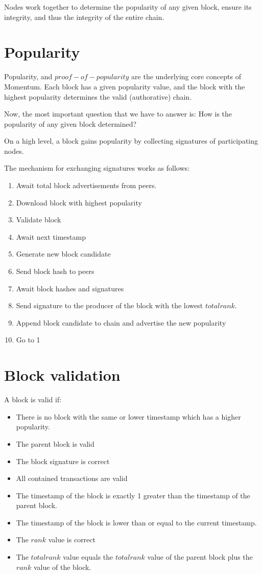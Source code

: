 \documentclass[conference]{IEEEtran}
\begin{document}
Nodes work together to determine the popularity of any given block, ensure its integrity, and thus the integrity of the entire chain.

\section{Popularity}

Popularity, and $proof-of-popularity$ are the underlying core concepts of Momentum. Each block has a given popularity value, and the block with the highest popularity determines the valid (authorative) chain.

Now, the most important question that we have to answer is: How is the popularity of any given block determined?

On a high level, a block gains popularity by collecting signatures of participating nodes.

The mechanism for exchanging signatures works as follows:

\begin{enumerate}
\item Await total block advertisements from peers.
\item Download block with highest popularity
\item Validate block
\item Await next timestamp
\item Generate new block candidate
\item Send block hash to peers
\item Await block hashes and signatures
\item Send signature to the producer of the block with the lowest $total rank$.
\item Append block candidate to chain and advertise the new popularity
\item Go to 1
\end{enumerate}

\section{Block validation}

A block is valid if:

\begin{itemize}
\item There is no block with the same or lower timestamp which has a higher popularity.
\item The parent block is valid
\item The block signature is correct
\item All contained transactions are valid
\item The timestamp of the block is exactly 1 greater than the timestamp of the parent block.
\item The timestamp of the block is lower than or equal to the current timestamp.
\item The $rank$ value is correct
\item The $total rank$ value equals the $total rank$ value of the parent block plus the $rank$ value of the block.

\end{itemize}
\end{document}
